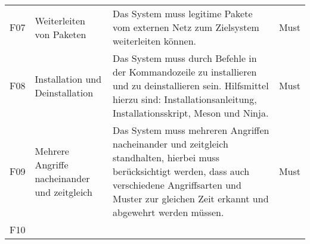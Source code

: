 \documentclass[../review_3.tex]{subfiles}
\begin{document}
\begin{longtable} [h] {p{1cm} p{4cm} p{7cm} l}
    F07                                                                                                                                                                                                              & Weiterleiten von Paketen                       & Das System muss legitime Pakete vom externen Netz zum Zielsystem weiterleiten können.                                                                                                                                                                   & Must            \\
    F08                                                                                                                                                                                                              & Installation und Deinstallation                & Das System muss durch Befehle in der Kommandozeile zu installieren und zu deinstallieren sein. Hilfsmittel hierzu sind: Installationsanleitung, Installationsskript, Meson und Ninja.                                                                   & Must            \\
    F09                                                                                                                                                                                                              & Mehrere Angriffe nacheinander und zeitgleich & Das System muss mehreren Angriffen nacheinander und zeitgleich standhalten, hierbei muss berücksichtigt werden, dass auch verschiedene Angriffsarten und Muster zur gleichen Zeit erkannt und abgewehrt werden müssen.                                  & Must            \\
    F10
    

\end{longtable}
\end{document}
